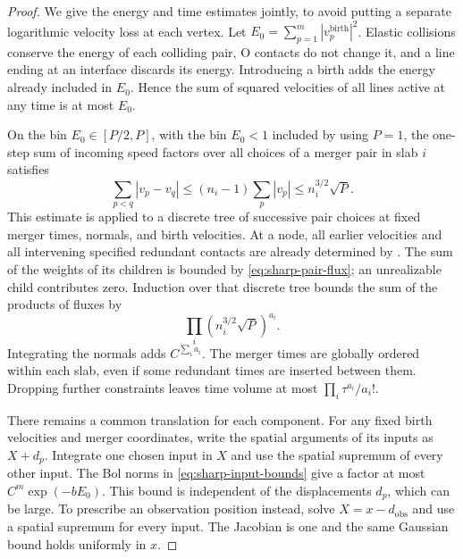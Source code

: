 \begin{proof}
We give the energy and time estimates jointly, to avoid putting a
separate logarithmic velocity loss at each vertex.  Let
\(E_0=\sum_{p=1}^m|v_p^{\mathrm{birth}}|^2\).
Elastic collisions conserve the energy of each colliding pair, O
contacts do not change it, and a line ending at an interface discards
its energy.  Introducing a birth adds the energy already included in
\(E_0\).  Hence the sum of squared velocities of all lines active at
any time is at most \(E_0\).

On the bin \(E_0\in[P/2,P]\), with the bin \(E_0<1\) included by
using \(P=1\), the one-step sum of incoming speed factors over all
choices of a merger pair in slab \(i\) satisfies
\begin{equation}\label{eq:sharp-pair-flux}
 \sum_{p<q}|v_p-v_q|
 \le (n_i-1)\sum_p|v_p|
 \le n_i^{3/2}\sqrt P.
\end{equation}
This estimate is applied to a discrete tree of successive pair
choices at fixed merger times, normals, and birth velocities.  At a
node, all earlier velocities and all intervening specified redundant
contacts are already determined by
.  The sum of the weights of its
children is bounded by \eqref{eq:sharp-pair-flux}; an unrealizable
child contributes zero.  Induction over that discrete tree bounds
the sum of the products of fluxes by
\begin{equation}\label{eq:sharp-pair-products}
                  \prod_i(n_i^{3/2}\sqrt P)^{a_i}.
\end{equation}
Integrating the normals adds \(C^{\sum_i a_i}\).  The merger times
are globally ordered within each slab, even if some redundant times
are inserted between them.  Dropping further constraints leaves
time volume at most \(\prod_i\tau^{a_i}/a_i!\).

There remains a common translation for each component.  For any
fixed birth velocities and merger coordinates, write the spatial
arguments of its inputs as \(X+d_p\).  Integrate one chosen input
in \(X\) and use the spatial supremum of every other input.  The
Bol norms in \eqref{eq:sharp-input-bounds} give a factor at most
\(C^m\exp(-bE_0)\).  This bound is independent of the displacements
\(d_p\), which can be large.  To prescribe an observation position
instead, solve \(X=x-d_{\mathrm{obs}}\) and use a spatial supremum
for every input.  The Jacobian is one and the same Gaussian bound
holds uniformly in \(x\).


\end{proof}
